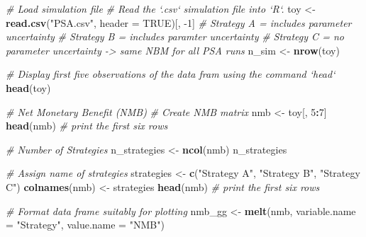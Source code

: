 \documentclass[
]{article}
\newenvironment{Shaded}{\begin{snugshade}}{\end{snugshade}}
\newcommand{\CommentTok}[1]{\textcolor[rgb]{0.56,0.35,0.01}{\textit{#1}}}
\newcommand{\DataTypeTok}[1]{\textcolor[rgb]{0.13,0.29,0.53}{#1}}
\newcommand{\DecValTok}[1]{\textcolor[rgb]{0.00,0.00,0.81}{#1}}
\newcommand{\KeywordTok}[1]{\textcolor[rgb]{0.13,0.29,0.53}{\textbf{#1}}}
\newcommand{\NormalTok}[1]{#1}
\newcommand{\OperatorTok}[1]{\textcolor[rgb]{0.81,0.36,0.00}{\textbf{#1}}}
\newcommand{\OtherTok}[1]{\textcolor[rgb]{0.56,0.35,0.01}{#1}}
\newcommand{\StringTok}[1]{\textcolor[rgb]{0.31,0.60,0.02}{#1}}
\begin{document}
\begin{Shaded}
\begin{Highlighting}[]
\CommentTok{# Load simulation file}
\CommentTok{# Read the `.csv` simulation file into `R`.}
\NormalTok{toy   <-}\StringTok{ }\KeywordTok{read.csv}\NormalTok{(}\StringTok{"PSA.csv"}\NormalTok{, }\DataTypeTok{header =} \OtherTok{TRUE}\NormalTok{)[, }\DecValTok{-1}\NormalTok{]}
\CommentTok{# Strategy A = includes parameter uncertainty}
\CommentTok{# Strategy B = includes paramter uncertainty}
\CommentTok{# Strategy C = no parameter uncertainty -> same NBM for all PSA runs}
\NormalTok{n_sim <-}\StringTok{ }\KeywordTok{nrow}\NormalTok{(toy)}

\CommentTok{# Display first five observations of the data fram using the command `head`}
\KeywordTok{head}\NormalTok{(toy)}

\CommentTok{# Net Monetary Benefit (NMB) }
\CommentTok{# Create NMB matrix}
\NormalTok{nmb <-}\StringTok{ }\NormalTok{toy[, }\DecValTok{5}\OperatorTok{:}\DecValTok{7}\NormalTok{]}
\KeywordTok{head}\NormalTok{(nmb) }\CommentTok{# print the first six rows }

\CommentTok{# Number of Strategies}
\NormalTok{n_strategies <-}\StringTok{ }\KeywordTok{ncol}\NormalTok{(nmb)}
\NormalTok{n_strategies}

\CommentTok{# Assign name of strategies}
\NormalTok{strategies    <-}\StringTok{ }\KeywordTok{c}\NormalTok{(}\StringTok{"Strategy A"}\NormalTok{, }\StringTok{"Strategy B"}\NormalTok{, }\StringTok{"Strategy C"}\NormalTok{)}
\KeywordTok{colnames}\NormalTok{(nmb) <-}\StringTok{ }\NormalTok{strategies}
\KeywordTok{head}\NormalTok{(nmb)  }\CommentTok{# print the first six rows }

\CommentTok{# Format data frame suitably for plotting}
\NormalTok{nmb_gg <-}\StringTok{ }\KeywordTok{melt}\NormalTok{(nmb,  }
               \DataTypeTok{variable.name =} \StringTok{"Strategy"}\NormalTok{, }
               \DataTypeTok{value.name =} \StringTok{"NMB"}\NormalTok{)}


\end{Highlighting}
\end{Shaded}
\end{document}
